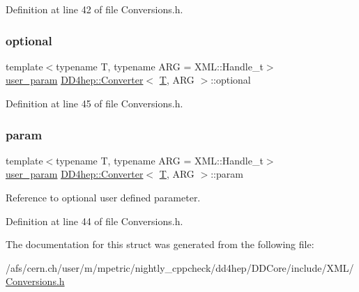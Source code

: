 Definition at line 42 of file Conversions.\+h.

\hypertarget{struct_d_d4hep_1_1_converter_a884a538646c4dd3043e3d6234db2cc0d}{}\label{struct_d_d4hep_1_1_converter_a884a538646c4dd3043e3d6234db2cc0d} 
\subsubsection{\texorpdfstring{optional}{optional}}
{\footnotesize\ttfamily template$<$typename T, typename A\+RG = X\+M\+L\+::\+Handle\+\_\+t$>$ \\
\hyperlink{struct_d_d4hep_1_1_converter_a13a876ea9cfcadf85a3dadd32e97a834}{user\+\_\+param} \hyperlink{struct_d_d4hep_1_1_converter}{D\+D4hep\+::\+Converter}$<$ \hyperlink{class_t}{T}, A\+RG $>$\+::optional}



Definition at line 45 of file Conversions.\+h.

\hypertarget{struct_d_d4hep_1_1_converter_ac6d7d17feb235d19267a40c8e6dfb2ca}{}\label{struct_d_d4hep_1_1_converter_ac6d7d17feb235d19267a40c8e6dfb2ca} 
\subsubsection{\texorpdfstring{param}{param}}
{\footnotesize\ttfamily template$<$typename T, typename A\+RG = X\+M\+L\+::\+Handle\+\_\+t$>$ \\
\hyperlink{struct_d_d4hep_1_1_converter_a13a876ea9cfcadf85a3dadd32e97a834}{user\+\_\+param} \hyperlink{struct_d_d4hep_1_1_converter}{D\+D4hep\+::\+Converter}$<$ \hyperlink{class_t}{T}, A\+RG $>$\+::param}



Reference to optional user defined parameter. 



Definition at line 44 of file Conversions.\+h.



The documentation for this struct was generated from the following file\+:\begin{DoxyCompactItemize}
\item 
/afs/cern.\+ch/user/m/mpetric/nightly\+\_\+cppcheck/dd4hep/\+D\+D\+Core/include/\+X\+M\+L/\hyperlink{_conversions_8h}{Conversions.\+h}\end{DoxyCompactItemize}
